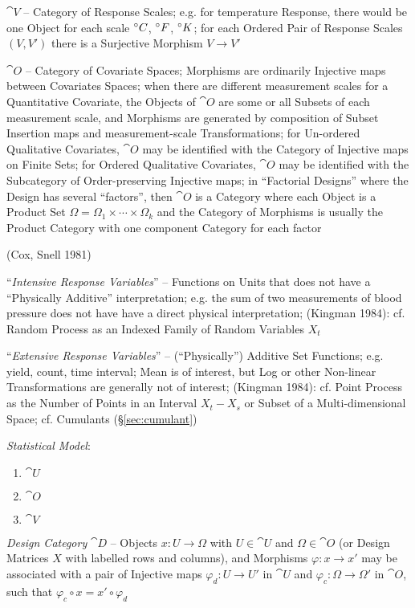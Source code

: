 $\cat{V}$ -- Category of Response Scales; e.g. for temperature Response, there
would be one Object for each scale $^{\circ} C$, $^{\circ} F$, $^{\circ} K$; for
each Ordered Pair of Response Scales $(V, V')$ there is a Surjective Morphism
$V \to V'$

$\cat{O}$ -- Category of Covariate Spaces; Morphisms are ordinarily
Injective maps between Covariates Spaces; when there are different measurement
scales for a Quantitative Covariate, the Objects of $\cat{O}$ are some or
all Subsets of each measurement scale, and Morphisms are generated by
composition of Subset Insertion maps and measurement-scale Transformations; for
Un-ordered Qualitative Covariates, $\cat{O}$ may be identified with the
Category of Injective maps on Finite Sets; for Ordered Qualitative Covariates,
$\cat{O}$ may be identified with the Subcategory of Order-preserving
Injective maps; in ``Factorial Designs'' where the Design has several
``factors'', then $\cat{O}$ is a Category where each Object is a Product
Set $\Omega = \Omega_1 \times \cdots \times \Omega_k$ and the Category of
Morphisms is usually the Product Category with one component Category for each
factor

(Cox, Snell 1981)

``\emph{Intensive Response Variables}'' -- Functions on Units that does not have
a ``Physically Additive'' interpretation; e.g. the sum of two measurements of
blood pressure does not have have a direct physical interpretation;
(Kingman 1984): cf. Random Process as an Indexed Family of Random Variables
$X_t$

``\emph{Extensive Response Variables}'' -- (``Physically'') Additive Set
Functions; e.g. yield, count, time interval; Mean is of interest, but Log
or other Non-linear Transformations are generally not of interest;
(Kingman 1984): cf. Point Process as the Number of Points in an Interval
$X_t - X_s$ or Subset of a Multi-dimensional Space; cf. Cumulants
(\S\ref{sec:cumulant})

\emph{Statistical Model}:
\begin{enumerate}
  \item $\cat{U}$
  \item $\cat{O}$
  \item $\cat{V}$
\end{enumerate}

\emph{Design Category} $\cat{D}$ -- Objects $x : U \to \Omega$ with
$U \in \cat{U}$ and $\Omega \in \cat{O}$ (or Design Matrices $X$ with labelled
rows and columns), and Morphisms $\varphi : x \to x'$ may be associated with a
pair of Injective maps $\varphi_d : U \to U'$ in $\cat{U}$ and
$\varphi_c : \Omega \to \Omega'$ in $\cat{O}$, such that
$\varphi_c \circ x = x' \circ \varphi_d$

